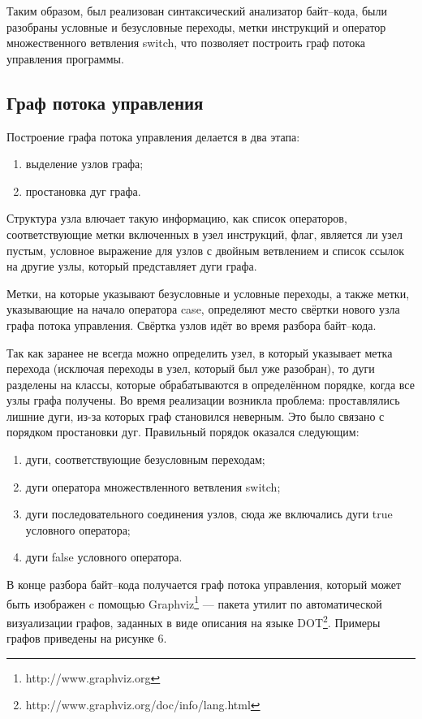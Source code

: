 Таким образом, был реализован синтаксический анализатор байт--кода, были разобраны условные и безусловные переходы, метки инструкций и оператор множественного ветвления switch, что позволяет построить граф потока управления программы. 

\subsection{Граф потока управления}
Построение графа потока управления делается в два этапа:
\begin{enumerate}
\item выделение узлов графа;
\item простановка дуг графа.
\end{enumerate}

Структура узла влючает такую информацию, как список операторов, соответствующие метки включенных в узел инструкций, флаг, является ли узел пустым, условное выражение для узлов с двойным ветвлением и список ссылок на другие узлы, который представляет дуги графа.

Метки, на которые указывают безусловные и условные переходы, а также метки, указывающие на начало оператора case, определяют место свёртки нового узла графа потока управления. Свёртка узлов идёт во время разбора байт--кода.

Так как заранее не всегда можно определить узел, в который указывает метка перехода (исключая переходы в узел, который был уже разобран), то дуги разделены на классы, которые обрабатываются в определённом порядке, когда все узлы графа получены. Во время реализации возникла проблема: проставлялись лишние дуги, из-за которых граф становился неверным. Это было связано с порядком простановки дуг. Правильный порядок оказался следующим:
\begin{enumerate}
\item дуги, соответствующие безусловным переходам;
\item дуги оператора множествленного ветвления switch;
\item дуги последовательного соединения узлов, сюда же включались дуги true условного оператора;
\item дуги false условного оператора.
\end{enumerate}

В конце разбора байт--кода получается граф потока управления, который может быть изображен c помощью Graphviz\footnote{http://www.graphviz.org} --- пакета утилит по автоматической визуализации графов, заданных в виде описания на языке DOT\footnote{http://www.graphviz.org/doc/info/lang.html}.
Примеры графов приведены на рисунке 6.

